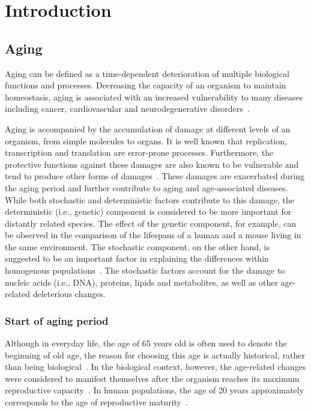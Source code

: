 \chapter{Introduction}
\label{chp:b1}

\section{Aging}
Aging can be defined as a time-dependent deterioration of multiple biological functions and processes.
Decreasing the capacity of an organism to maintain homeostasis, 
aging is associated with an increased vulnerability to many diseases including cancer, cardiovascular and neurodegenerative disorders~\autocite{Niccoli2012}.

Aging is accompanied by the accumulation of damage at different levels of an organism, from simple molecules to organs.
It is well known that replication, transcription and translation are error-prone processes.
Furthermore, the protective functions against these damages are also known to be vulnerable and tend to produce other forms of damages~\autocite{Gladyshev2016}.
These damages are exacerbated during the aging period and further contribute to aging and age-associated diseases.
While both stochastic and deterministic factors contribute to this damage, 
the deterministic (i.e., genetic) component is considered to be more important for distantly related species.
The effect of the genetic component, for example, can be observed in the comparison of the lifespans of a human and a mouse living in the same environment.
The stochastic component, on the other hand, is suggested to be an important factor in explaining the differences within homogenous populations~\autocite{Gladyshev2016}.
The stochastic factors account for the damage to nucleic acids (i.e., DNA), proteins, lipids and metabolites, as well as other age-related deleterious changes.

\subsection{Start of aging period}
Although in everyday life, the age of 65 years old is often used to denote the beginning of old age, 
the reason for choosing this age is actually historical, rather than being biological~\autocite{Covey1992}.
In the biological context, however, the age-related changes were considered to manifest themselves after the organism reaches its maximum reproductive capacity~\autocite{Vijg2009}.
In human populations, the age of 20 years approximately corresponds to the age of reproductive maturity~\autocite{Walker2006}.


